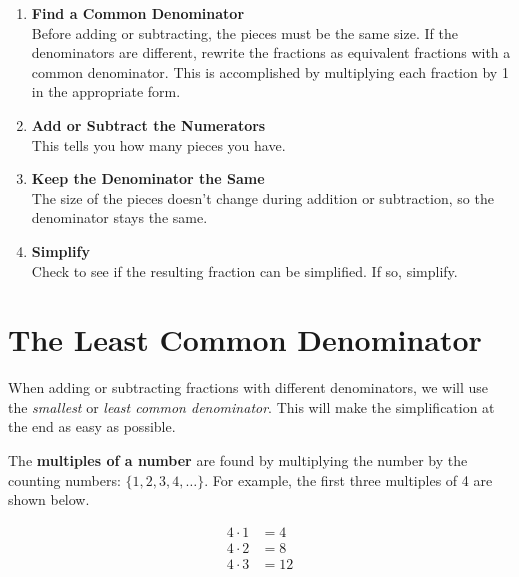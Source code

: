\documentclass{ximera}
\begin{document}
\begin{procedure}

\begin{enumerate}
    \item \textbf{Find a Common Denominator} \\
     Before adding or subtracting, the pieces must be the same size. If the denominators are different, rewrite the fractions as equivalent fractions with a 
     common denominator.  This is accomplished by multiplying each fraction by 1 in the appropriate form.

    \item \textbf{Add or Subtract the Numerators} \\
     This tells you how many pieces you have.

    \item \textbf{Keep the Denominator the Same} \\
    The size of the pieces doesn't change during addition or subtraction, so the denominator stays the same.

    \item \textbf{Simplify} \\
    Check to see if the resulting fraction can be simplified. If so, simplify.
\end{enumerate}
\end{procedure}


\section*{The Least Common Denominator}

When adding or subtracting fractions with different denominators, we will use the \emph{smallest} or \emph{least common denominator}.  This will
make the simplification at the end as easy as possible.

\begin{definition}

The \textbf{multiples of a number} are found by multiplying the number by the counting numbers: $\{1, 2, 3, 4, \ldots \}.$
For example, the first three multiples of 4 are shown below.  

\begin{align*}
4 \cdot 1 & = 4\\
4 \cdot 2 & = 8\\
4 \cdot 3 & = 12
\end{align*}

\end{definition}
\end{document}
